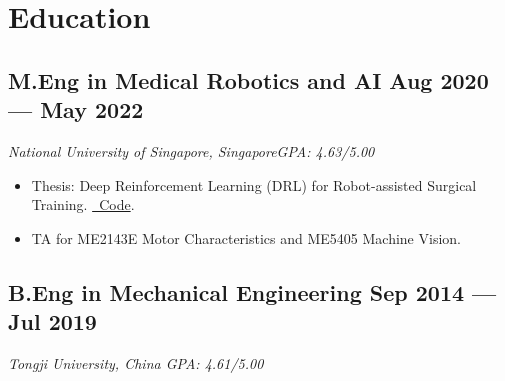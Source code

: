 \documentclass[a4paper,10pt]{article}
\newif\ifallver
\newcommand{\subtextit}[1]{
\vspace{0cm} 
\textit{ #1 
\vspace{-0.1cm}} }
\newenvironment{zitemize}{
\vspace{0.06cm}
\begin{itemize}\itemsep 1pt \parskip 1pt \parsep 3pt}
{\end{itemize}\vspace{-0.32cm}}
\begin{document}
\section{Education}
\subsection*{\large M.Eng in Medical Robotics and AI \hfill Aug 2020 --- May 2022} 
\subtextit{National University of Singapore, Singapore\hfill GPA: 4.63/5.00 }
\begin{zitemize}
    \item Thesis:  Deep Reinforcement Learning (DRL) for Robot-assisted Surgical Training. \href{https://github.com/Kexin-Wei/Soft-tissue-deformation-in-laparoscopic-surgery-planning-with-DRL}{\faGithub~Code}.
    \item TA for ME2143E Motor Characteristics and ME5405 Machine Vision.
\end{zitemize}

\subsection*{\large B.Eng in Mechanical Engineering \quad {\normalsize \normalfont } \hfill Sep 2014 ---  Jul 2019} 
\subtextit{ Tongji University, China \hfill GPA: 4.61/5.00}

\ifallver
\end{document}
